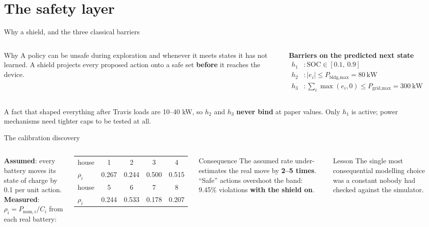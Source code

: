\documentclass[aspectratio=169,10pt]{beamer}
\newcommand{\SOC}{\mathrm{SOC}}
\begin{document}
\section{The safety layer}

\begin{frame}{Why a shield, and the three classical barriers}
\begin{columns}[T]
\begin{block}{Why}
A policy can be unsafe during exploration and whenever it meets states it has not learned. A shield projects every proposed action onto a safe set \textbf{before} it reaches the device.
\end{block}
\textbf{Barriers on the predicted next state}
\begin{align*}
h_1&: \SOC \in [0.1,\ 0.9]\\
h_2&: |e_i| \le P_{\text{bldg,max}} = 80\ \text{kW}\\
h_3&: \textstyle\sum_i \max(e_i,0) \le P_{\text{grid,max}} = 300\ \text{kW}
\end{align*}
\end{columns}
\vspace{0.4em}
\begin{alertblock}{A fact that shaped everything after}
Travis loads are 10--40 kW, so $h_2$ and $h_3$ \textbf{never bind} at paper values. Only $h_1$ is active; power mechanisms need tighter caps to be tested at all.
\end{alertblock}
\end{frame}

\begin{frame}{The calibration discovery}
\begin{columns}[T]
\textbf{Assumed}: every battery moves its state of charge by 0.1 per unit action.\\[4pt]
\textbf{Measured}: $\rho_i = P_{\text{nom},i}/C_i$ from each real battery:
\vspace{0.3em}
\small
\begin{tabular}{@{}lcccc@{}}
\toprule
house & 1 & 2 & 3 & 4 \\
$\rho_i$ & 0.267 & 0.244 & 0.500 & 0.515 \\
\midrule
house & 5 & 6 & 7 & 8 \\
$\rho_i$ & 0.244 & 0.533 & 0.178 & 0.207 \\
\bottomrule
\end{tabular}
\begin{alertblock}{Consequence}
The assumed rate under-estimates the real move by \textbf{2--5 times}. ``Safe'' actions overshoot the band: 9.45\% violations \textbf{with the shield on}.
\end{alertblock}
\begin{exampleblock}{Lesson}
The single most consequential modelling choice was a constant nobody had checked against the simulator.
\end{exampleblock}
\end{columns}
\end{frame}
\end{document}
